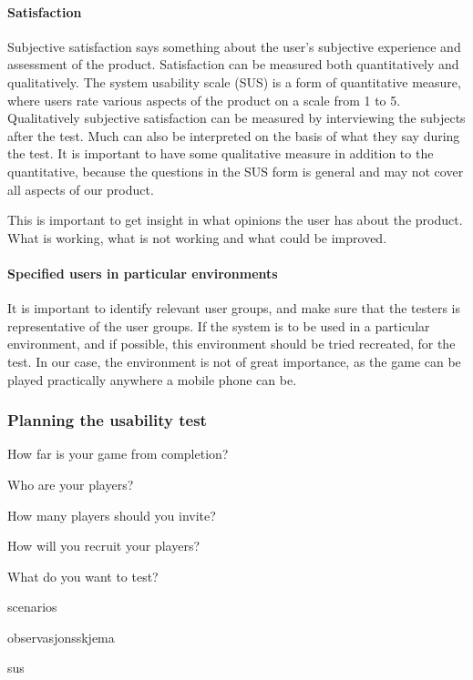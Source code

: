 \paragraph{Satisfaction}

Subjective satisfaction says something about the user's subjective experience and assessment of the product. Satisfaction can be measured both quantitatively and qualitatively. The system usability scale (SUS) is a form of quantitative measure, where users rate various aspects of the product on a scale from 1 to 5. Qualitatively subjective satisfaction can be measured by interviewing the subjects after the test. Much can also be interpreted on the basis of what they say during the test. It is important to have some qualitative measure in addition to the quantitative, because the questions in the SUS form is general and may not cover all aspects of our product.

This is important to get insight in what opinions the user has about the product. What is working, what is not working and what could be improved.

\paragraph{Specified users in particular environments}

It is important to identify relevant user groups, and make sure that the testers is representative of the user groups. If the system is to be used in a particular environment, and if possible, this environment should be tried recreated, for the test. In our case, the environment is not of great importance, as the game can be played practically anywhere a mobile phone can be.

\subsubsection{Planning the usability test}

How far is your game from completion?

Who are your players?

How many players should you invite?

How will you recruit your players?

What do you want to test?



scenarios

observasjonsskjema

sus









